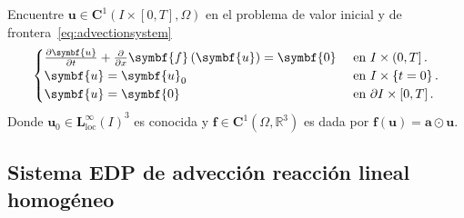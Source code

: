 Encuentre
\begin{math}
	\symbf{u}\in
	\symbf{C}^{1}\left(I\times\left[0,T\right],\Omega\right)
\end{math}
en el problema de valor inicial y de frontera~\eqref{eq:advectionsystem}
\begin{equation}\label{eq:advectionsystem}
	\begin{cases}
		\diffp{\symbf{u}}{t}+\diffp{}{x}\symbf{f}\left(\symbf{u}\right)=
		\symbf{0}     &
		\text{ en }I\times\left(0,T\right].   \\
		\symbf{u}                                                      =
		\symbf{u}_{0} &
		\text{ en }I\times\left\{t=0\right\}. \\
		\symbf{u}                                                      =
		\symbf{0}     &
		\text{ en }\partial I\times\left[0,T\right].
	\end{cases}
\end{equation}
Donde
\begin{math}
	\symbf{u}_{0}\in
	{\symbf{L}^{\infty}_{\text{loc}}\left(I\right)}^{3}
\end{math}
es conocida y
\begin{math}
	\symbf{f}\in
	\symbf{C}^{1}\left(\Omega,\mathbb{R}^{3}\right)
\end{math}
es dada por
\begin{math}
	\symbf{f}\left(\symbf{u}\right)=
	\symbf{a}\odot\symbf{u}
\end{math}.

\subsection*{Sistema EDP de advección reacción lineal homogéneo}

